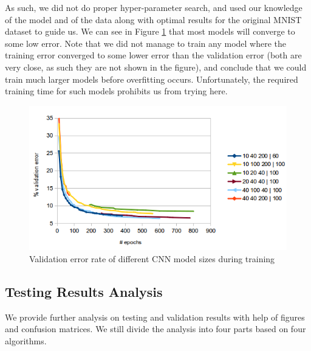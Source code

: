 \documentclass{acm_proc_article-sp}
\begin{document}
As such, we did not do proper hyper-parameter search, and used our knowledge of the model and of the data along with optimal results for the original MNIST dataset to guide us. We can see in Figure \ref{fig:conv_train} that most models will converge to some low error. Note that we did not manage to train any model where the training error converged to some lower error than the validation error (both are very close, as such they are not shown in the figure), and conclude that we could train much larger models before overfitting occurs. Unfortunately, the required training time for such models prohibits us from trying here.
\begin{figure} 
\centering
\includegraphics[width=1\columnwidth]{graphs/conv_train.png}  
\caption{Validation error rate of different CNN model sizes during training}
\label{fig:conv_train}
\end{figure}

\subsection{Testing Results Analysis}
We provide further analysis on testing and validation results with help of figures and confusion matrices. We still divide the analysis into four parts based on four algorithms.
\end{document}
